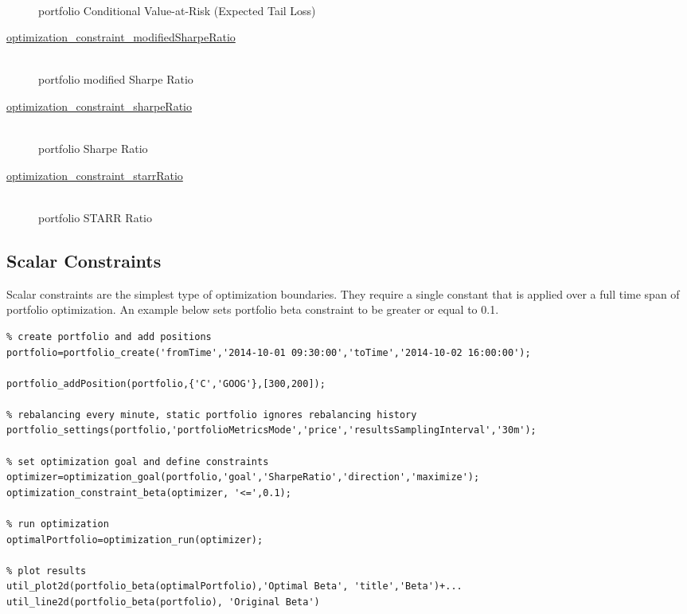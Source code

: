 \documentclass[letterpaper]{report}
\begin{document}
\begin{description}
\hfill \\
portfolio Conditional Value-at-Risk (Expected Tail Loss)
\item[\href{https://www.portfolioeffect.com/docs/platform/quant/functions/optimization-functions/optimization-constraint-modified-sharpe-ratio}{optimization\_constraint\_modifiedSharpeRatio}]
\hfill \\
portfolio modified Sharpe Ratio
\item[\href{https://www.portfolioeffect.com/docs/platform/quant/functions/optimization-functions/optimization-constraint-sharpe-ratio}{optimization\_constraint\_sharpeRatio}]
\hfill \\
portfolio Sharpe Ratio
\item[\href{https://www.portfolioeffect.com/docs/platform/quant/functions/optimization-functions/optimization-constraint-starr-ratio}{optimization\_constraint\_starrRatio}]
\hfill \\
portfolio STARR Ratio
\end{description}

\subsection{Scalar Constraints}
Scalar constraints are the simplest type of optimization boundaries. 
They require a single constant that is applied over a full time span of portfolio optimization. 
An example below sets portfolio beta constraint to be greater or equal to 0.1.

\begin{lstlisting}
% create portfolio and add positions
portfolio=portfolio_create('fromTime','2014-10-01 09:30:00','toTime','2014-10-02 16:00:00');

portfolio_addPosition(portfolio,{'C','GOOG'},[300,200]);

% rebalancing every minute, static portfolio ignores rebalancing history
portfolio_settings(portfolio,'portfolioMetricsMode','price','resultsSamplingInterval','30m');

% set optimization goal and define constraints
optimizer=optimization_goal(portfolio,'goal','SharpeRatio','direction','maximize');
optimization_constraint_beta(optimizer, '<=',0.1);

% run optimization
optimalPortfolio=optimization_run(optimizer);

% plot results
util_plot2d(portfolio_beta(optimalPortfolio),'Optimal Beta', 'title','Beta')+...
util_line2d(portfolio_beta(portfolio), 'Original Beta')
\end{lstlisting}
\end{document}
